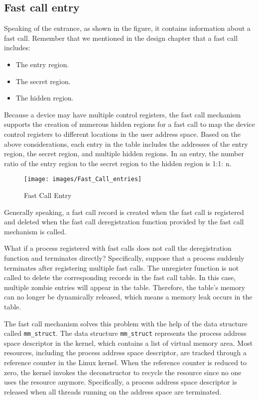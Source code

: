 \subsection{Fast call entry}

Speaking of the entrance, as shown in the figure, it contains information about 
a fast call.  Remember that we mentioned in the design chapter that 
a fast call includes:
\begin{itemize}
  \item The entry region.
  \item The secret region.
  \item The hidden region.
\end{itemize}
Because a device may have multiple control registers, 
the fast call mechanism supports the creation of numerous 
hidden regions for a fast call to map the device control registers to different locations in 
the user address space. Based on the above considerations, each entry in 
the table includes the addresses of 
the entry region, the secret region, and multiple hidden regions. 
In an entry, the number ratio of the entry region to the secret region 
to the hidden region is 1:1: n.
\begin{figure}[tbp]
  \centering
  \texttt{[image: images/Fast\_Call\_entries]}
  \caption[Short description]{Fast Call Entry}
  \label{fig:Fast_Call_entries}
\end{figure}
Generally speaking, a fast call record is created when the 
fast call is registered and deleted when the fast call deregistration 
function provided by the fast call mechanism is called.

What if a process registered with fast calls does 
not call the deregistration function and terminates directly? 
Specifically, suppose that a process suddenly terminates after 
registering multiple fast calls. The unregister function is not 
called to delete the corresponding records in the fast call table. 
In this case, multiple zombie entries will appear in the table. 
Therefore, the table's memory can no longer be dynamically released, 
which means a memory leak occurs in the table.

The fast call mechanism solves this problem with the help 
of the data structure called \verb|mm_struct|.  The data structure \verb|mm_struct|
represents the process address space descriptor in the kernel, which contains a list of virtual memory area.
 Most resources, including the process address space descriptor, 
 are tracked through a reference counter in the Linux kernel.  
 When the reference counter is reduced to zero, the kernel invokes the 
 deconstructor to recycle the resource since no one uses the resource anymore.  
 Specifically, a process address space descriptor is released when all threads 
 running on the address space are terminated. 

